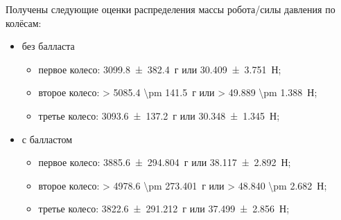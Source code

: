 Получены следующие оценки распределения массы робота/силы давления по колёсам:
\begin{itemize}
    \item без балласта
    \begin{itemize}
        \item первое колесо: \qty{3099.8 \pm 382.4}{г} или \qty{30.409 \pm 3.751}{Н};
        \item второе колесо: \qty{> 5085.4 \pm 141.5}{г} или \qty{> 49.889 \pm 1.388}{Н};
        \item третье колесо: \qty{3093.6 \pm 137.2}{г} или \qty{30.348 \pm 1.345}{Н};
    \end{itemize}
    \item с балластом
    \begin{itemize}
        \item первое колесо: \qty{3885.6 \pm 294.804}{г} или \qty{38.117 \pm 2.892}{Н};
        \item второе колесо: \qty{> 4978.6 \pm 273.401}{г} или \qty{> 48.840 \pm 2.682}{Н};
        \item третье колесо: \qty{3822.6 \pm 291.212}{г} или \qty{37.499 \pm 2.856}{Н};
    \end{itemize}
\end{itemize}